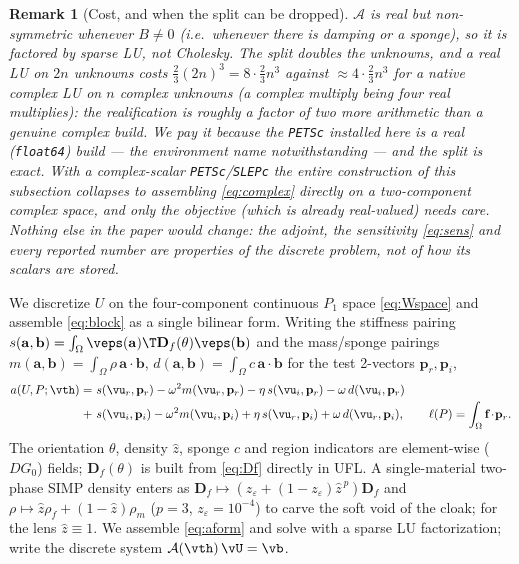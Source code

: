 \documentclass[11pt]{article}
\newtheorem{remark}{Remark}
\begin{document}
\begin{remark}[Cost, and when the split can be dropped]
\label{rem:cost}
$\mathcal A$ is real but \emph{non}-symmetric whenever $B\neq0$ (i.e.\ whenever
there is damping or a sponge), so it is factored by sparse LU, not Cholesky. The
split doubles the unknowns, and a real LU on $2n$ unknowns costs
$\tfrac23(2n)^3=8\cdot\tfrac23n^3$ against $\approx4\cdot\tfrac23n^3$ for a native
complex LU on $n$ complex unknowns (a complex multiply being four real
multiplies): the realification is roughly a \emph{factor of two} more arithmetic
than a genuine complex build. We pay it because the \texttt{PETSc} installed here
is a real (\texttt{float64}) build --- the environment name notwithstanding ---
and the split is exact. With a complex-scalar \texttt{PETSc}/\texttt{SLEPc} the
entire construction of this subsection collapses to assembling
\eqref{eq:complex} directly on a two-component complex space, and only the
objective (which is already real-valued) needs care. Nothing else in the paper
would change: the adjoint, the sensitivity \eqref{eq:sens} and every reported
number are properties of the discrete problem, not of how its scalars are stored.
\end{remark}

We discretize $U$ on the four-component continuous $P_1$ space
\eqref{eq:Wspace} and assemble \eqref{eq:block} as a single bilinear form. Writing the stiffness pairing
$s(\mathbf a,\mathbf b)=\int_\Omega\veps(\mathbf a)\T\mathbf D_f(\theta)\veps(\mathbf b)$
and the mass/sponge pairings $m(\mathbf a,\mathbf b)=\int_\Omega\rho\,\mathbf a
\!\cdot\!\mathbf b$, $d(\mathbf a,\mathbf b)=\int_\Omega c\,\mathbf a\!\cdot\!
\mathbf b$ for the test 2-vectors $\mathbf p_r,\mathbf p_i$,
\begin{equation}
\begin{aligned}
  a(U,P;\vth)=\ &s(\vu_r,\mathbf p_r)-\omega^2 m(\vu_r,\mathbf p_r)
  -\eta\,s(\vu_i,\mathbf p_r)-\omega\,d(\vu_i,\mathbf p_r)\\[-1pt]
  +\ &s(\vu_i,\mathbf p_i)-\omega^2 m(\vu_i,\mathbf p_i)
  +\eta\,s(\vu_r,\mathbf p_i)+\omega\,d(\vu_r,\mathbf p_i),\qquad
  \ell(P)=\int_\Omega\mathbf f\!\cdot\!\mathbf p_r .
\end{aligned}
\label{eq:aform}
\end{equation}
The orientation $\theta$, density $\hat z$, sponge $c$ and region indicators are
element-wise ($DG_0$) fields; $\mathbf D_f(\theta)$ is built from \eqref{eq:Df}
directly in UFL. A single-material two-phase SIMP density enters as
$\mathbf D_f\!\mapsto\!(z_\varepsilon+(1-z_\varepsilon)\hat z^{\,p})\mathbf D_f$
and $\rho\!\mapsto\!\hat z\rho_f+(1-\hat z)\rho_m$ ($p=3$, $z_\varepsilon=10^{-4}$)
to carve the soft void of the cloak; for the lens $\hat z\equiv1$. We assemble
\eqref{eq:aform} and solve with a sparse LU factorization; write the discrete
system $\mathcal A(\vth)\,\vU=\vb$.
\end{document}
